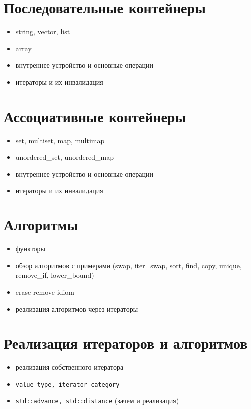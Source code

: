 \documentclass[11pt,dvipsnames]{report}
\begin{document}
\section{Последовательные контейнеры}
\begin{itemize}[noitemsep]
	\item string, vector, list
	\item array
	\item внутреннее устройство и основные операции
	\item итераторы и их инвалидация
\end{itemize}

\section{Ассоциативные контейнеры}
\begin{itemize}[noitemsep]
	\item set, multiset, map, multimap
	\item unordered\_set, unordered\_map
	\item внутреннее устройство и основные операции
	\item итераторы и их инвалидация
\end{itemize}

\section{Алгоритмы}
\begin{itemize}[noitemsep]
	\item функторы
	\item обзор алгоритмов с примерами (swap, iter\_swap, sort, find, copy, unique, remove\_if, lower\_bound)
	\item erase-remove idiom
	\item реализация алгоритмов через итераторы
\end{itemize}

\section{Реализация итераторов и алгоритмов}
\begin{itemize}[noitemsep]
	\item реализация собственного итератора
	\item \texttt{value\_type, iterator\_category}
	\item \texttt{std::advance, std::distance} (зачем и реализация)
\end{itemize}
\end{document}
